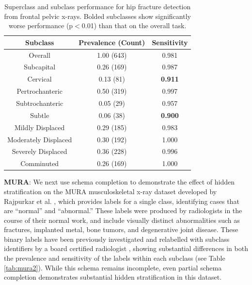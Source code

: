 \documentclass[sigconf,anonymous,review]{acmart}
\begin{document}
\begin{table}[htb!]
\centering
\begin{tabular}{ccc}
\toprule
 Subclass & Prevalence (Count) & Sensitivity \\
 \toprule
 Overall & 1.00 (643) & 0.981  \\
 Subcapital & 0.26 (169) & 0.987   \\
 Cervical & 0.13 (81) & \textbf{0.911}\\
 Pertrochanteric & 0.50 (319)  & 0.997\\
 Subtrochanteric & 0.05 (29) & 0.957 \\
 Subtle & 0.06 (38) & \textbf{0.900}\\
 Mildly Displaced & 0.29 (185) & 0.983\\
 Moderately Displaced & 0.30 (192) & 1.000\\
 Severely Displaced & 0.36 (228) & 0.996\\
 Comminuted & 0.26 (169) & 1.000 \\ 
 \toprule
\end{tabular}
\caption{Superclass and subclass performance for hip fracture detection from frontal pelvic x-rays. Bolded subclasses show significantly worse performance (p$<$0.01) than that on the overall task.}
\label{tab:hip1}
\end{table}

\textbf{MURA}: We next use schema completion to demonstrate the effect of hidden stratification on the MURA musculoskeletal x-ray dataset developed by Rajpurkar et al. \citep{Rajpurkar2017-rc}, which provides labels for a single class, identifying cases that are ``normal'' and ``abnormal.'' 
These labels were produced by radiologists in the course of their normal work, and include visually distinct abnormalities such as fractures, implanted metal, bone tumors, and degenerative joint disease. 
These binary labels have been previously investigated and relabelled with subclass identifiers by a board certified radiologist \citep{Oakden-Rayner2019-yi}, showing substantial differences in both the prevalence and sensitivity of the labels within each subclass (see Table \ref{tab:mura2}). 
While this schema remains incomplete, even partial schema completion demonstrates substantial hidden stratification in this dataset.
\end{document}
